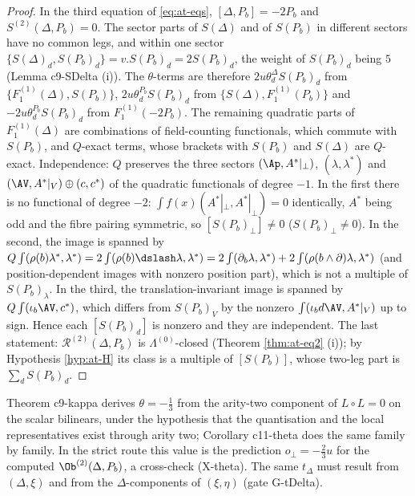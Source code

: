 \begin{proof}
In the third equation of \eqref{eq:at-eqs}, $[\Delta,P_b]=-2P_b$ and $S^{(2)}(\Delta,P_b)=0$. The sector parts of $S(\Delta)$ and of $S(P_b)$ in different sectors have no common legs, and within one sector $\{S(\Delta)_d,S(P_b)_d\}=v.S(P_b)_d=2S(P_b)_d$, the weight of $S(P_b)_d$ being $5$ (Lemma c9-SDelta (i)). The $\theta$-terms are therefore $2u\theta^\Delta_dS(P_b)_d$ from $\{F_1^{(1)}(\Delta),S(P_b)\}$, $2u\theta^{P_b}_dS(P_b)_d$ from $\{S(\Delta),F_1^{(1)}(P_b)\}$ and $-2u\theta^{P_b}_dS(P_b)_d$ from $F_1^{(1)}(-2P_b)$. The remaining quadratic parts of $F_1^{(1)}(\Delta)$ are combinations of field-counting functionals, which commute with $S(P_b)$, and $Q$-exact terms, whose brackets with $S(P_b)$ and $S(\Delta)$ are $Q$-exact. Independence: $Q$ preserves the three sectors $(\Ap,A^*|_\perp)$, $(\lambda,\lambda^*)$ and $(\AV,A^*|_V)\oplus(c,c^*)$ of the quadratic functionals of degree $-1$. In the first there is no functional of degree $-2$: $\int f(x)(A^*|_\perp,A^*|_\perp)=0$ identically, $A^*$ being odd and the fibre pairing symmetric, so $[S(P_b)_\perp]\ne0$ ($S(P_b)_\perp\ne0$). In the second, the image is spanned by $Q\int(\rho(b)\lambda^*,\lambda^*)=2\int(\rho(b)\dslash\lambda,\lambda^*)=2\int(\partial_b\lambda,\lambda^*)+2\int(\rho(b\wedge\partial)\lambda,\lambda^*)$ (and position-dependent images with nonzero position part), which is not a multiple of $S(P_b)_\lambda$. In the third, the translation-invariant image is spanned by $Q\int(\iota_b\AV,c^*)$, which differs from $S(P_b)_V$ by the nonzero $\int(\iota_bd\AV,A^*|_V)$ up to sign. Hence each $[S(P_b)_d]$ is nonzero and they are independent. The last statement: $\mathcal R^{(2)}(\Delta,P_b)$ is $\Lambda^{(0)}$-closed (Theorem \ref{thm:at-eq2} (i)); by Hypothesis \ref{hyp:at-H} its class is a multiple of $[S(P_b)]$, whose two-leg part is $\sum_dS(P_b)_d$.
\end{proof}

\begin{remark}
\label{rem:at-thetacheck}
Theorem c9-kappa derives $\theta=-\tfrac13$ from the arity-two component of $L\circ L=0$ on the scalar bilinears, under the hypothesis that the quantisation and the local representatives exist through arity two; Corollary c11-theta does the same family by family. In the strict route this value is the prediction $o_\perp=-\tfrac23u$ for the computed $\Ob^{(2)}(\Delta,P_b)$, a cross-check (X-theta). The same $t_\Delta$ must result from $(\Delta,\xi)$ and from the $\Delta$-components of $(\xi,\eta)$ (gate G-tDelta).
\end{remark}

